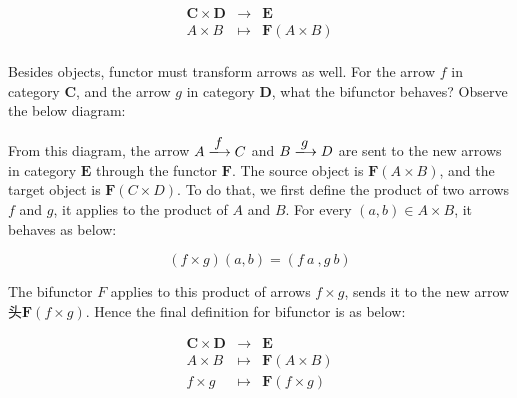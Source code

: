 \documentclass[b5paper]{article}
\begin{document}
\[
\begin{array}{rcl}
\pmb{C} \times \pmb{D} & \longrightarrow & \pmb{E} \\
A \times B & \longmapsto & \mathbf{F}(A \times B) \\
\end{array}
\]

Besides objects, functor must transform arrows as well. For the arrow $f$ in category $\pmb{C}$, and the arrow $g$ in category $\pmb{D}$, what the bifunctor behaves? Observe the below diagram:

\begin{center}
\end{center}

From this diagram, the arrow $A \arrowto{f} C$ and $B \arrowto{g} D$ are sent to the new arrows in category $\pmb{E}$ through the functor $\mathbf{F}$. The source object is $\mathbf{F}(A \times B)$, and the target object is $\mathbf{F}(C \times D)$. To do that, we first define the product of two arrows $f$ and $g$, it applies to the product of $A$ and $B$. For every $(a, b) \in A \times B$, it behaves as below:

\[
(f \times g)(a, b) = (f\ a\ , g\ b)
\]

The bifunctor $F$ applies to this product of arrows $f \times g$, sends it to the new arrow 头$\mathbf{F}(f \times g)$. Hence the final definition for bifunctor is as below:

\[
\begin{array}{rcl}
\pmb{C} \times \pmb{D} & \longrightarrow & \pmb{E} \\
A \times B & \longmapsto & \mathbf{F}(A \times B) \\
f \times g & \longmapsto & \mathbf{F}(f \times g) \\
\end{array}
\]
\end{document}
